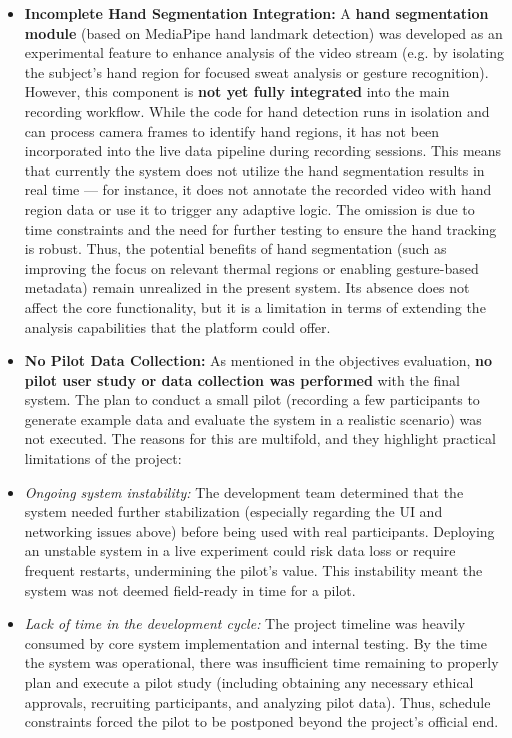 \begin{itemize}
\item \textbf{Incomplete Hand Segmentation Integration:} A \textbf{hand segmentation
  module} (based on MediaPipe hand landmark detection) was developed as
  an experimental feature to enhance analysis of the video stream (e.g.
  by isolating the subject's hand region for focused sweat analysis or
  gesture recognition). However, this component is \textbf{not yet fully
  integrated} into the main recording workflow. While the code for hand
  detection runs in isolation and can process camera frames to identify
  hand regions, it has not been incorporated into the live data pipeline
  during recording sessions. This means that currently the system does
  not utilize the hand segmentation results in real time --- for
  instance, it does not annotate the recorded video with hand region
  data or use it to trigger any adaptive logic. The omission is due to
  time constraints and the need for further testing to ensure the hand
  tracking is robust. Thus, the potential benefits of hand segmentation
  (such as improving the focus on relevant thermal regions or enabling
  gesture-based metadata) remain unrealized in the present system. Its
  absence does not affect the core functionality, but it is a limitation
  in terms of extending the analysis capabilities that the platform
  could offer.

\item \textbf{No Pilot Data Collection:} As mentioned in the objectives
  evaluation, \textbf{no pilot user study or data collection was performed}
  with the final system. The plan to conduct a small pilot (recording a
  few participants to generate example data and evaluate the system in a
  realistic scenario) was not executed. The reasons for this are
  multifold, and they highlight practical limitations of the project:

\item \textit{Ongoing system instability:} The development team determined that the
  system needed further stabilization (especially regarding the UI and
  networking issues above) before being used with real participants.
  Deploying an unstable system in a live experiment could risk data loss
  or require frequent restarts, undermining the pilot's value. This
  instability meant the system was not deemed field-ready in time for a
  pilot.

\item \textit{Lack of time in the development cycle:} The project timeline was
  heavily consumed by core system implementation and internal testing.
  By the time the system was operational, there was insufficient time
  remaining to properly plan and execute a pilot study (including
  obtaining any necessary ethical approvals, recruiting participants,
  and analyzing pilot data). Thus, schedule constraints forced the pilot
  to be postponed beyond the project's official end.


\end{itemize}
